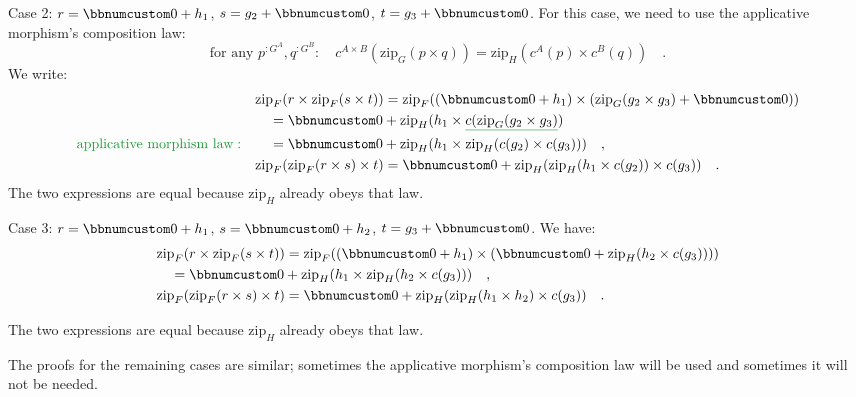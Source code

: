 Case 2: $r=\bbnum 0+h_{1}$, $s=g_{2}+\bbnum 0$, $t=g_{3}+\bbnum 0$.
For this case, we need to use the applicative morphism\textsf{'}s composition
law:
\[
\text{for any }p^{:G^{A}},q^{:G^{B}}:\quad c^{A\times B}(\text{zip}_{G}(p\times q))=\text{zip}_{H}(c^{A}(p)\times c^{B}(q))\quad.
\]
 We write:
\begin{align*}
 & \text{zip}_{F}(r\times\text{zip}_{F}(s\times t))=\text{zip}_{F}((\bbnum 0+h_{1})\times(\text{zip}_{G}(g_{2}\times g_{3})+\bbnum 0))\\
 & \quad=\bbnum 0+\text{zip}_{H}(h_{1}\times\gunderline{c(\text{zip}_{G}(g_{2}\times g_{3})})\\
{\color{greenunder}\text{applicative morphism law}:}\quad & \quad=\bbnum 0+\text{zip}_{H}(h_{1}\times\text{zip}_{H}(c(g_{2})\times c(g_{3})))\quad,\\
 & \text{zip}_{F}(\text{zip}_{F}(r\times s)\times t)=\bbnum 0+\text{zip}_{H}(\text{zip}_{H}(h_{1}\times c(g_{2}))\times c(g_{3}))\quad.
\end{align*}
The two expressions are equal because $\text{zip}_{H}$ already obeys
that law.

Case 3: $r=\bbnum 0+h_{1}$, $s=\bbnum 0+h_{2}$, $t=g_{3}+\bbnum 0$.
We have:
\begin{align*}
 & \text{zip}_{F}(r\times\text{zip}_{F}(s\times t))=\text{zip}_{F}((\bbnum 0+h_{1})\times(\bbnum 0+\text{zip}_{H}(h_{2}\times c(g_{3}))))\\
 & \quad=\bbnum 0+\text{zip}_{H}(h_{1}\times\text{zip}_{H}(h_{2}\times c(g_{3})))\quad,\\
 & \text{zip}_{F}(\text{zip}_{F}(r\times s)\times t)=\bbnum 0+\text{zip}_{H}(\text{zip}_{H}(h_{1}\times h_{2})\times c(g_{3}))\quad.
\end{align*}

The two expressions are equal because $\text{zip}_{H}$ already obeys
that law.

The proofs for the remaining cases are similar; sometimes the applicative
morphism\textsf{'}s composition law will be used and sometimes it will not
be needed.

